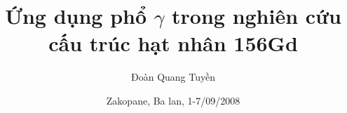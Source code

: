 \usepackage[T1, T2A,T2B,T2C,T5]{fontenc}
\usepackage[utf8]{inputenc}
\usepackage[english, french, russian, main = vietnamese]{babel}

\usepackage{amssymb, amsthm}
\usepackage[intlimits]{mathtools}

\usepackage{graphicx}

\title[Cấu trúc hạt nhân 156Gd]{Ứng dụng phổ $\gamma$ trong nghiên cứu cấu trúc hạt nhân 156Gd}
\author[D.Q. Tuyền]{Đoàn Quang Tuyền}
\date[Zakopane, 2008]{Zakopane, Ba lan, 1-7/09/2008} 

